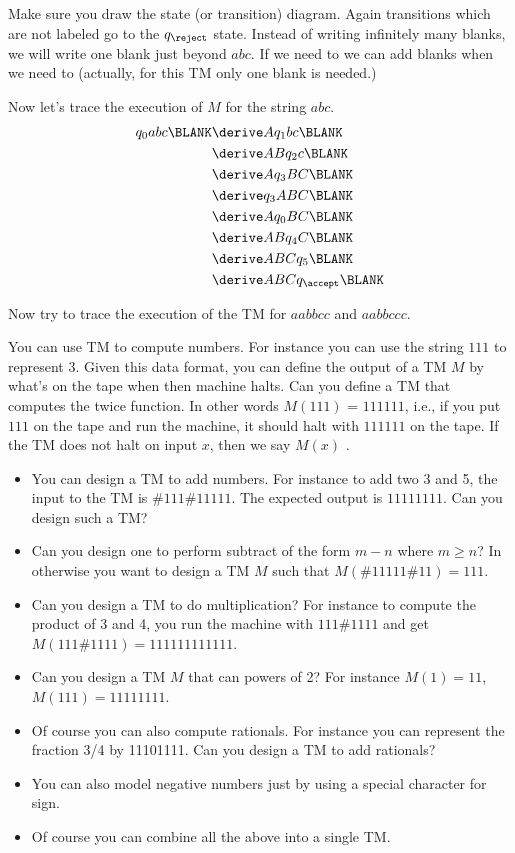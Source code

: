 \begin{eg}
Make sure you draw the state (or transition) diagram. Again
transitions which are not labeled go to the $q_{\reject}$ state.
Instead of writing infinitely many blanks, we will write one blank
just beyond $abc$. If we need to we can add blanks when we need to
(actually, for this TM only one blank is needed.)

Now let's trace the execution of $M$ for the string $abc$.
\begin{align*}
q_0 abc\BLANK
 &\derive Aq_1bc\BLANK \\
 &\derive ABq_2c\BLANK \\
 &\derive Aq_3BC\BLANK \\
 &\derive q_3ABC\BLANK \\
 &\derive Aq_0BC\BLANK \\
 &\derive ABq_4C\BLANK \\
 &\derive ABCq_5\BLANK \\
 &\derive ABCq_{\accept}\BLANK \\
\end{align*}

Now try to trace the execution of the TM for $aabbcc$ and
$aabbccc$.
\end{eg}

\begin{eg}
You can use TM to compute numbers. For instance you can use the
string $111$ to represent $3$. Given this data format, you can
define the output of a TM $M$ by what's on the tape when then
machine halts. Can you define a TM that computes the twice
function. In other words $M(111)$ = $111111$, i.e., if you put
$111$ on the tape and run the machine, it should halt with
$111111$ on the tape. If the TM does not halt on input $x$, then
we say $M(x)$ .
\begin{itemize}
 \item You can design a
 TM to add numbers. For instance to add two 3 and 5, the input to
 the TM is $\#111\#11111$. The expected output is $11111111$. Can
 you design such a TM?
\item Can you design one to perform subtract
 of the form $m-n$ where $m\geq n$? In otherwise you want to
 design a TM $M$ such that $M(\#11111\#11) = 111$.
 \item Can you design a TM to do multiplication? For instance to
 compute the product of 3 and 4, you run the machine with
 $111\#1111$ and get $M(111\#1111) = 111111111111$.
 \item Can you design a TM $M$ that can powers of 2? For instance
 $M(1) = 11$, $M(111) = 11111111$.
 \item Of course you can also compute rationals. For instance you
 can represent the fraction 3/4 by 11101111. Can you design a TM
 to add rationals?
 \item You can also model negative numbers just by using a special
 character for sign.
 \item Of course you can combine all the above into a single TM.
\end{itemize}
\end{eg}


